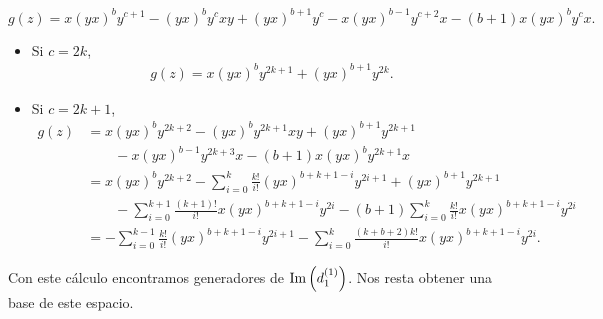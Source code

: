 \documentclass[fleqn,../tesis.tex]{subfiles}
\begin{document}
\begin{itemize}
    \[
       g(z) = x(yx)^by^{c + 1} - (yx)^by^{c}xy + (yx)^{b + 1}y^c - x(yx)^{b -1}y^{c + 2}x - (b + 1)x(yx)^by^cx.
    \]
    \begin{itemize}
        \item Si $c = 2k$,
        \begin{align*}
            g(z) = x(yx)^by^{2k + 1} + (yx)^{b + 1}y^{2k}.
        \end{align*}
        \item Si $c = 2k + 1$,
        \begin{align*}
            g(z) &= x(yx)^by^{2k + 2} - (yx)^by^{2k + 1}xy + (yx)^{b + 1}y^{2k + 1} \\
            &\qquad - x(yx)^{b -1}y^{2k + 3}x - (b + 1)x(yx)^by^{2k + 1}x\\
            &= x(yx)^by^{2k + 2} - \sum_{i = 0}^{k}\frac{k!}{i!}(yx)^{b + k + 1 - i}y^{2i + 1} + (yx)^{b + 1}y^{2k + 1}\\
                &\qquad -\sum_{i = 0}^{k + 1}\frac{(k + 1)!}{i!}x(yx)^{b + k + 1 - i}y^{2i}
                    - (b + 1)\sum_{i = 0}^{k}\frac{k!}{i!}x(yx)^{b + k + 1 - i}y^{2i}\\
            &= -\sum_{i = 0}^{k - 1}\frac{k!}{i!}(yx)^{b + k + 1 - i}y^{2i + 1}
                    - \sum_{i = 0}^{k}\frac{(k + b + 2)k!}{i!}x(yx)^{b + k + 1 - i}y^{2i}.
        \end{align*}
    \end{itemize}
\end{itemize}
Con este cálculo encontramos generadores de $\operatorname{Im}\left(d_1^{(1)}\right)$. Nos resta obtener una base de este espacio.
\end{document}
